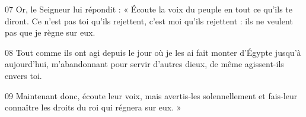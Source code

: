 
07 Or, le Seigneur lui répondit : « Écoute la voix du peuple en tout ce qu’ils te diront. Ce n’est pas toi qu’ils rejettent, c’est moi qu’ils rejettent : ils ne veulent pas que je règne sur eux.

08 Tout comme ils ont agi depuis le jour où je les ai fait monter d’Égypte jusqu’à aujourd’hui, m’abandonnant pour servir d’autres dieux, de même agissent-ils envers toi.

09 Maintenant donc, écoute leur voix, mais avertis-les solennellement et fais-leur connaître les droits du roi qui régnera sur eux. »
